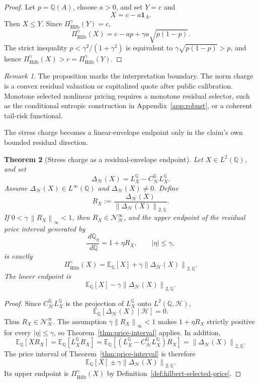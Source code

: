 \documentclass[11pt,a4paper]{amsart}
\theoremstyle{plain}
\newtheorem{theorem}{Theorem}[section]
\theoremstyle{definition}
\theoremstyle{remark}
\newtheorem{remark}[theorem]{Remark}
\newcommand{\QQ}{\mathbb{Q}}
\newcommand{\EE}{\mathbb{E}}
\newcommand{\cH}{\mathcal{H}}
\newcommand{\cN}{\mathcal{N}}
\newcommand{\one}{\mathbf{1}}
\newcommand{\dd}{\,d}
\newcommand{\norm}[1]{\left\lVert #1\right\rVert}
\begin{document}
\begin{proof}
Let \(p=\QQ(A)\), choose \(a>0\), and set \(Y=c\) and
\[
        X=c-a\one_A.
\]
Then \(X\le Y\).  Since \(\Pi_{\mathrm{Hilb}}^\gamma(Y)=c\),
\[
        \Pi_{\mathrm{Hilb}}^\gamma(X)
        =
        c-ap+\gamma a\sqrt{p(1-p)}.
\]
The strict inequality \(p<\gamma^2/(1+\gamma^2)\) is equivalent to
\(\gamma\sqrt{p(1-p)}>p\), and hence \(\Pi_{\mathrm{Hilb}}^\gamma(X)>c=\Pi_{\mathrm{Hilb}}^\gamma(Y)\).
\end{proof}

\begin{remark}
The proposition marks the interpretation boundary.  The norm charge is a convex residual valuation
or capitalized quote after public calibration.  Monotone selected nonlinear pricing requires a
monotone residual selector, such as the conditional entropic construction in Appendix~\ref{app:robust},
or a coherent tail-risk functional.
\end{remark}

The stress charge becomes a linear-envelope endpoint only in the claim's own bounded residual direction.

\begin{theorem}[Stress charge as a residual-envelope endpoint]\label{thm:stress-charge-as-envelope}
Let \(X\in L^2(\QQ)\), and set
\[
        \Delta_{\cH}(X)
        =
        L_X^\QQ-C_{\cH}^{\QQ}L_X^\QQ.
\]
Assume \(\Delta_{\cH}(X)\in L^\infty(\QQ)\) and \(\Delta_{\cH}(X)\ne0\).  Define
\[
        R_X
        :=
        \frac{\Delta_{\cH}(X)}{\norm{\Delta_{\cH}(X)}_{2,\QQ}}.
\]
If \(0<\gamma\,\norm{R_X}_\infty<1\), then \(R_X\in\cN_\cH^\infty\), and the upper endpoint of
the residual price interval generated by
\[
        \frac{\dd\QQ_\eta}{\dd\QQ}=1+\eta R_X,
        \qquad |\eta|\le \gamma,
\]
is exactly
\[
        \Pi_{\mathrm{Hilb}}^\gamma(X)
        =
        \EE_\QQ[X]+\gamma\norm{\Delta_{\cH}(X)}_{2,\QQ}.
\]
The lower endpoint is
\[
        \EE_\QQ[X]-\gamma\norm{\Delta_{\cH}(X)}_{2,\QQ}.
\]
\end{theorem}

\begin{proof}
Since \(C_{\cH}^{\QQ}L_X^\QQ\) is the projection of \(L_X^\QQ\) onto \(L^2(\QQ,\cH)\),
\[
        \EE_\QQ[\Delta_{\cH}(X)\mid\cH]=0.
\]
Thus \(R_X\in\cN_\cH^\infty\).  The assumption
\(\gamma\norm{R_X}_\infty<1\) makes \(1+\eta R_X\) strictly positive for every
\(|\eta|\le\gamma\), so Theorem~\ref{thm:price-interval} applies.  In addition,
\[
        \EE_\QQ[XR_X]
        =
        \EE_\QQ[L_X^\QQ R_X]
        =
        \EE_\QQ[(L_X^\QQ-C_{\cH}^{\QQ}L_X^\QQ)R_X]
        =
        \norm{\Delta_{\cH}(X)}_{2,\QQ}.
\]
The price interval of Theorem~\ref{thm:price-interval} is therefore
\[
        \EE_\QQ[X]
        \pm
        \gamma\norm{\Delta_{\cH}(X)}_{2,\QQ}.
\]
Its upper endpoint is \(\Pi_{\mathrm{Hilb}}^\gamma(X)\) by Definition~\ref{def:hilbert-selected-price}.
\end{proof}
\end{document}
